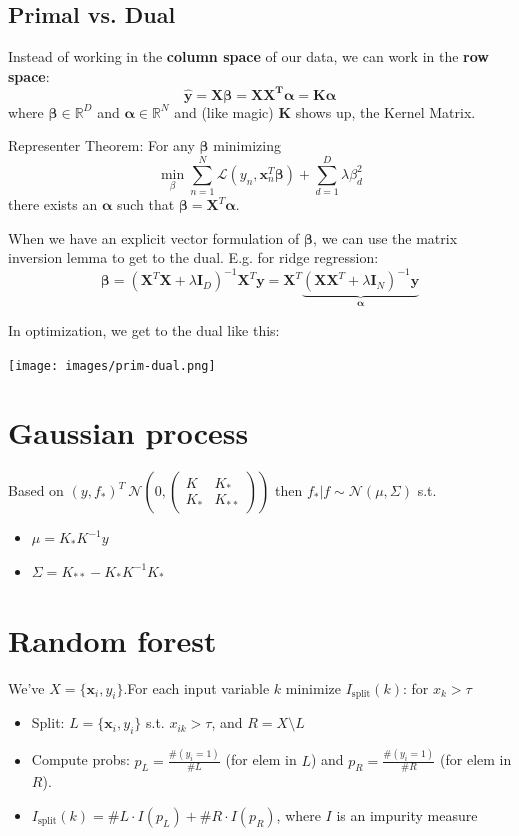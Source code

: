 \documentclass[10pt,a4paper,landscape]{article}
\renewcommand{\bf}[1]{\ensuremath{\mathbf{#1}}}
\newcommand{\balpha}{\boldsymbol\alpha}
\newcommand{\bbeta}{\boldsymbol\beta}
\begin{document}
\begin{multicols*}{4}
\subsection{Primal vs. Dual}
Instead of working in the \textbf{column space} of our data, we can work in the \textbf{row space}:
$$\bf{\hat{y} = X \bbeta = X X^T \balpha = K \balpha}$$
where $\bbeta \in \mathbb{R}^D$ and $\balpha \in \mathbb{R}^N$
and (like magic) $\bf{K}$ shows up, the Kernel Matrix.

Representer Theorem: For any $\bbeta$ minimizing
$$\min_\beta \sum_{n=1}^N \mathcal{L}(y_n, \bf{x}_n^T \bbeta) + \sum_{d=1}^D \lambda \beta_d^2$$
there exists an $\balpha$ such that $\bbeta = \bf{X}^T \balpha$.

When we have an explicit vector formulation of $\bbeta$, we can use the matrix inversion lemma to get to the dual. E.g. for ridge regression:
$$\bbeta = (\bf{X}^T \bf{X}  + \lambda \bf{I}_D)^{-1} \bf{X}^T \bf{y}= \bf{X}^T \underbrace{(\bf{X X}^T + \lambda \bf{I}_N)^{-1} \bf{y}}_{\balpha}$$

In optimization, we get to the dual like this:
\begin{colfig}
  \centering
  \texttt{[image: images/prim-dual.png]}
\end{colfig}

\section{Gaussian process}
Based on $(y, f_*)^T ~\mathcal{N}\left(0, \begin{pmatrix} K&K_*\\K_*&K_{**}\end{pmatrix}\right)$ then $f_*|f \sim\mathcal{N}(\mu, \Sigma)$ s.t.
\begin{itemize}
	\item $\mu = K_*K^{-1}y$
	\item $\Sigma = K_{**}  - K_*K^{-1}K_*$
\end{itemize}

\section{Random forest}
We've $X = \{\mathbf{x}_i, y_i\}$.For each input variable $k$ minimize $I_{\text{split}}(k)$: for $x_k > \tau$
\begin{itemize}
	\item Split: $L= \{\mathbf{x}_i, y_i\}$ s.t. $x_{ik} >\tau$, and $R = X\setminus L$
	\item Compute probs: $p_L = \frac{\#(y_i = 1)}{\#L}$ (for elem in $L$) and $p_R = \frac{\#(y_i = 1)}{\#R}$ (for elem in $R$).
	\item $I_{\text{split}}(k) = \#L\cdot I(p_L) + \#R\cdot I(p_R)$, where $I$ is an impurity measure
\end{itemize}


\end{multicols*}
\end{document}
